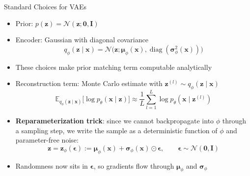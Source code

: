 \documentclass[11pt,compress,t,notes=noshow, xcolor=table]{beamer}
\providecommand{\bx}{\mathbf{x}}
\providecommand{\bz}{\mathbf{z}}
\begin{document}
\begin{frame}{Standard Choices for VAEs}

\vfill

\begin{itemize}
\item Prior: $p(\bz) = \mathcal{N}(\bz; \mathbf{0}, \mathbf{I})$
\item Encoder: Gaussian with diagonal covariance
\begin{equation*}
q_\phi(\bz \mid \bx) = \mathcal{N}\big(\bz; \boldsymbol{\mu}_\phi(\bx), \operatorname{diag}(\boldsymbol{\sigma}^2_\phi(\bx))\big)
\end{equation*}
\item These choices make prior matching term computable analytically
\item Reconstruction term: Monte Carlo estimate with $\bz^{(l)} \sim q_\phi(\bz \mid \bx)$
\begin{equation*}
\mathbb{E}_{q_\phi(\bz \mid \bx)}\big[\log p_\theta(\bx \mid \bz)\big] \approx \frac{1}{L} \sum_{l=1}^{L} \log p_\theta(\bx \mid \bz^{(l)})
\end{equation*}
\item \textbf{Reparameterization trick}: since we cannot backpropagate into $\phi$ through a sampling step, we write the sample as a deterministic function of $\phi$ and parameter-free noise:
\begin{equation*}
\bz = \bz_\phi(\boldsymbol{\epsilon}) := \boldsymbol{\mu}_\phi(\bx) + \boldsymbol{\sigma}_\phi(\bx) \odot \boldsymbol{\epsilon}, \qquad \boldsymbol{\epsilon} \sim \mathcal{N}(\mathbf{0}, \mathbf{I})
\end{equation*}
\item Randomness now sits in $\boldsymbol{\epsilon}$, so gradients flow through $\boldsymbol{\mu}_\phi$ and $\boldsymbol{\sigma}_\phi$
\end{itemize}

\vfill

\end{frame}
\end{document}
